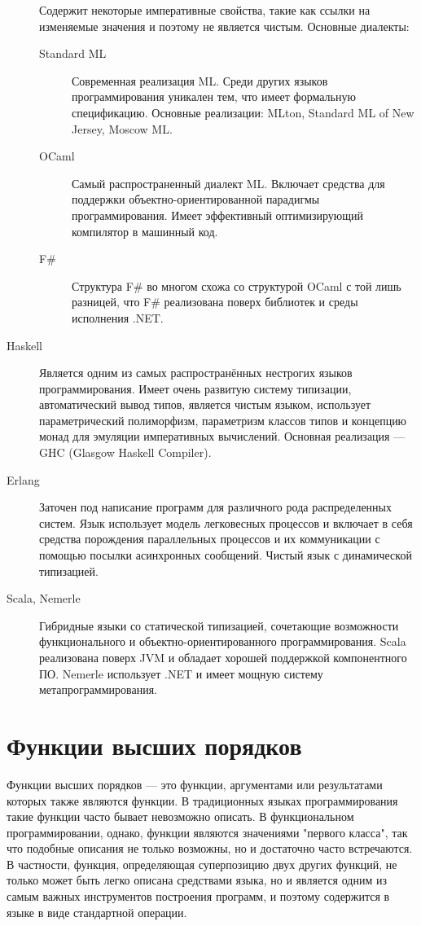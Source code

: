 \begin{description}
  Содержит некоторые императивные свойства, такие как ссылки на
  изменяемые значения и поэтому не является чистым. Основные диалекты:
  \begin{description}
    \item[Standard ML] Современная реализация ML. Среди других языков
      программирования уникален тем, что имеет формальную
      спецификацию. Основные реализации: MLton, Standard ML of New
      Jersey, Moscow ML.
    \item[OCaml] Самый распространенный диалект ML. Включает средства
      для поддержки объектно-ори\-ен\-ти\-ро\-ван\-ной парадигмы
      программирования. Имеет эффективный оптимизирующий компилятор в
      машинный код.
    \item[F\#] Структура F\# во многом схожа со структурой OCaml с той
      лишь разницей, что F\# реализована поверх библиотек и среды
      исполнения .NET.
  \end{description}
\item[Haskell] Является одним из самых распространённых нестрогих
  языков программирования. Имеет очень развитую систему типизации,
  автоматический вывод типов, является чистым языком, использует
  параметрический полиморфизм, параметризм классов типов и концепцию
  монад для эмуляции императивных вычислений. Основная реализация ---
  GHC (Glasgow Haskell Compiler).
\item[Erlang] Заточен под написание программ для различного рода
  распределенных систем. Язык использует модель легковесных процессов
  и включает в себя средства порождения параллельных процессов и их
  коммуникации с помощью посылки асинхронных сообщений. Чистый язык с
  динамической типизацией.
\item[Scala, Nemerle] Гибридные языки со статической типизацией,
  сочетающие возможности функционального и объектно-ориентированного
  программирования. Scala реализована поверх JVM и обладает хорошей
  поддержкой компонентного ПО. Nemerle использует .NET и имеет мощную
  систему метапрограммирования.
\end{description}

\section{Функции высших порядков}
Функции высших порядков --- это функции, аргументами или результатами
которых также являются функции. В традиционных языках программирования
такие функции часто бывает невозможно описать. В функциональном
программировании, однако, функции являются значениями "первого
класса", так что подобные описания не только возможны, но и достаточно
часто встречаются. В частности, функция, определяющая суперпозицию
двух других функций, не только может быть легко описана средствами
языка, но и является одним из самым важных инструментов построения
программ, и поэтому содержится в языке в виде стандартной операции.

